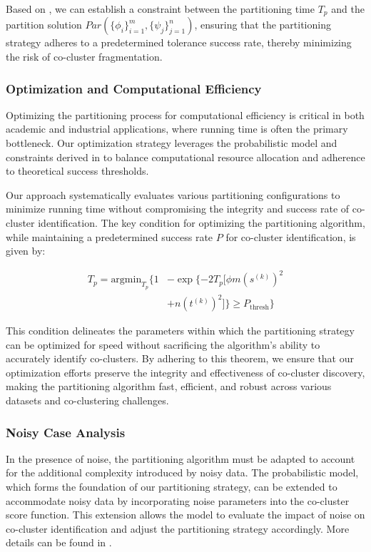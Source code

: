 \documentclass[journal]{IEEEtran}
\begin{document}
Based on , we can establish a constraint between the partitioning time $T_p$ and the partition solution $Par(\{\phi_i\}_{i=1}^m, \{\psi_j\}_{j=1}^n)$, ensuring that the partitioning strategy adheres to a predetermined tolerance success rate, thereby minimizing the risk of co-cluster fragmentation.

\subsubsection{Optimization and Computational Efficiency}

Optimizing the partitioning process for computational efficiency is critical in both academic and industrial applications, where running time is often the primary bottleneck. Our optimization strategy leverages the probabilistic model and constraints derived in  to balance computational resource allocation and adherence to theoretical success thresholds.

Our approach systematically evaluates various partitioning configurations to minimize running time without compromising the integrity and success rate of co-cluster identification. The key condition for optimizing the partitioning algorithm, while maintaining a predetermined success rate \( P \) for co-cluster identification, is given by:

\begin{align*}
  T_p = \text{argmin}_{T_p} \{
  1 & - \exp \{ -2 T_p [\phi m (s^{(k)})^2         \\
    & + n (t^{(k)})^2] \} \ge P_{\text{thresh}} \}
\end{align*}

This condition delineates the parameters within which the partitioning strategy can be optimized for speed without sacrificing the algorithm's ability to accurately identify co-clusters. By adhering to this theorem, we ensure that our optimization efforts preserve the integrity and effectiveness of co-cluster discovery, making the partitioning algorithm fast, efficient, and robust across various datasets and co-clustering challenges.

\subsubsection{Noisy Case Analysis}

In the presence of noise, the partitioning algorithm must be adapted to account for the additional complexity introduced by noisy data. The probabilistic model, which forms the foundation of our partitioning strategy, can be extended to accommodate noisy data by incorporating noise parameters into the co-cluster score function. This extension allows the model to evaluate the impact of noise on co-cluster identification and adjust the partitioning strategy accordingly. More details can be found in .
\end{document}
